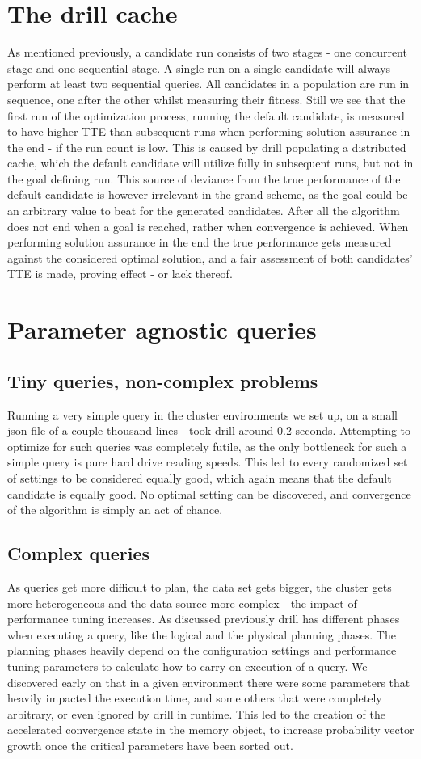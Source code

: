 \documentclass[a4paper,english]{report}
\begin{document}
	\section{The drill cache}
	\label{sec:cache}
		As mentioned previously, a candidate run consists of two stages - one concurrent stage and one sequential stage. A single run on a single candidate will always perform at least two sequential queries. All candidates in a population are run in sequence, one after the other whilst measuring their fitness. Still we see that the first run of the optimization process, running the default candidate, is measured to have higher TTE than subsequent runs when performing solution assurance in the end - if the run count is low. This is caused by drill populating a distributed cache, which the default candidate will utilize fully in subsequent runs, but not in the goal defining run. This source of deviance from the true performance of the default candidate is however irrelevant in the grand scheme, as the goal could be an arbitrary value to beat for the generated candidates. After all the algorithm does not end when a goal is reached, rather when convergence is achieved. When performing solution assurance in the end the true performance gets measured against the considered optimal solution, and a fair assessment of both candidates' TTE is made, proving effect - or lack thereof.
	\section{Parameter agnostic queries}
		\label{sec:param_agno}
		\subsection{Tiny queries, non-complex problems}
		Running a very simple query in the cluster environments we set up, on a small json file of a couple thousand lines - took drill around 0.2 seconds. Attempting to optimize for such queries was completely futile, as the only bottleneck for such a simple query is pure hard drive reading speeds. This led to every randomized set of settings to be considered equally good, which again means that the default candidate is equally good. No optimal setting can be discovered, and convergence of the algorithm is simply an act of chance.
		\subsection{Complex queries}
		As queries get more difficult to plan, the data set gets bigger, the cluster gets more heterogeneous and the data source more complex - the impact of performance tuning increases. As discussed previously drill has different phases when executing a query, like the logical and the physical planning phases. The planning phases heavily depend on the configuration settings and performance tuning parameters to calculate how to carry on execution of a query. We discovered early on that in a given environment there were some parameters that heavily impacted the execution time, and some others that were completely arbitrary, or even ignored by drill in runtime. This led to the creation of the accelerated convergence state in the memory object, to increase probability vector growth once the critical parameters have been sorted out.
\end{document}
